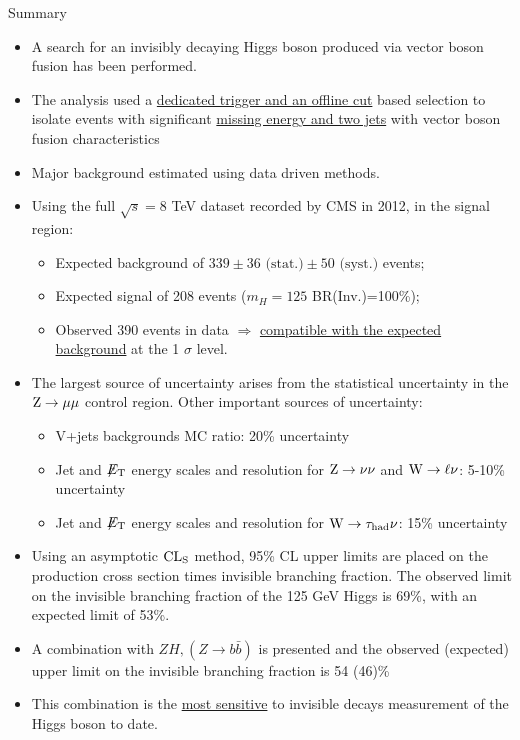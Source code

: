 \documentclass[8pt]{beamer}
\newcommand{\met}{\displaystyle{\not} E_{\rm T}}
\newcommand{\W}{{\rm W}}
\newcommand{\Z}{{\rm Z}}
\newcommand{\stat}{\text{ (stat.)}}
\newcommand{\syst}{\text{ (syst.)}}
\begin{document}
\begin{frame}{Summary}

\begin{block}

\begin{itemize}
 \item A search for an invisibly decaying Higgs boson produced via vector boson fusion has been performed. 
 \item The analysis used a \uline{dedicated trigger and an offline cut} based selection to isolate events with significant \uline{missing energy and two jets} with vector boson fusion characteristics
 \item Major background estimated using data driven methods.  
 \item Using the full $\sqrt{s}=8$ TeV dataset recorded by CMS in 2012, in the signal region:
 \begin{itemize}
  \item Expected background of $339 \pm 36 \stat \pm 50 \syst$ events;
  \item Expected signal of 208 events ($m_H = 125$ BR(Inv.)=100\%);
  \item Observed 390 events in data $\Rightarrow$ \uline{compatible with the expected background} at the 1 $\sigma$ level.
 \end{itemize}
 \item The largest source of uncertainty arises from the statistical uncertainty in the $\Z \rightarrow \mu \mu$ control region. Other important sources of uncertainty:
 \begin{itemize}
  \item V+jets backgrounds MC ratio: 20\% uncertainty
  \item Jet and $\met$ energy scales and resolution for $\Z \rightarrow \nu \nu$ and $\W \rightarrow \ell \nu$: 5-10\% uncertainty
  \item Jet and $\met$ energy scales and resolution for $\W \rightarrow \tau_{\rm had} \nu$: 15\% uncertainty
 \end{itemize} 
 \item Using an asymptotic ${\rm CL}_{\rm S}$ method, 95\% CL upper limits are placed on the production cross section times invisible branching fraction.  The observed limit on the invisible branching fraction of the 125 GeV Higgs is 69\%, with an expected limit of 53\%.  
 \item A combination with $ZH, (Z \rightarrow b\bar{b})$ is presented and the observed (expected) upper limit on the invisible branching fraction is 54 (46)\%
 \item This combination is the \uline{most sensitive} to invisible decays measurement of the Higgs boson to date.
\end{itemize}

\end{block}

\end{frame}
\end{document}
